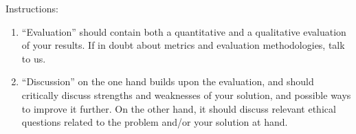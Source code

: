 \documentclass[11pt]{article}
\begin{document}
% 

%

Instructions: 
\begin{enumerate}
    \item ``Evaluation'' should contain both a quantitative and a qualitative evaluation of your results. If in doubt about metrics and evaluation methodologies, talk to us.
    \item ``Discussion'' on the one hand builds upon the evaluation, and should critically discuss strengths and weaknesses of your solution, and possible ways to improve it further. On the other hand, it should discuss relevant ethical questions related to the problem and/or your solution at hand.
\end{enumerate}
\end{document}

